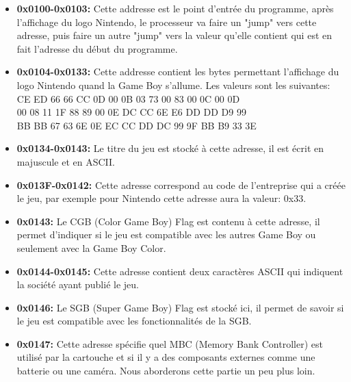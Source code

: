 \documentclass{report}
\begin{document}
\begin{itemize}

\item \textbf{0x0100-0x0103:} Cette addresse est le point d'entrée du programme, après l'affichage du logo Nintendo, le processeur va faire un "jump" vers cette adresse, puis faire un autre "jump" vers la valeur qu'elle contient qui est en fait l'adresse du début du programme.\\

\item \textbf{0x0104-0x0133:} Cette addresse contient les bytes permettant l'affichage du logo Nintendo quand la Game Boy s'allume. Les valeurs sont les suivantes:
\\CE ED 66 66 CC 0D 00 0B 03 73 00 83 00 0C 00 0D
\\00 08 11 1F 88 89 00 0E DC CC 6E E6 DD DD D9 99
\\BB BB 67 63 6E 0E EC CC DD DC 99 9F BB B9 33 3E\\

\item \textbf{0x0134-0x0143:} Le titre du jeu est stocké à cette adresse, il est écrit en majuscule et en ASCII.\\

\item \textbf{0x013F-0x0142:} Cette adresse correspond au code de l'entreprise qui a créée le jeu, par exemple pour Nintendo cette adresse aura la valeur: 0x33.\\

\item \textbf{0x0143:} Le CGB (Color Game Boy) Flag est contenu à cette adresse, il permet d'indiquer si le jeu est compatible avec les autres Game Boy ou seulement avec la Game Boy Color.\\

\item \textbf{0x0144-0x0145:} Cette adresse contient deux caractères ASCII qui indiquent la société ayant publié le jeu.\\

\item \textbf{0x0146:} Le SGB (Super Game Boy) Flag est stocké ici, il permet de savoir si le jeu est compatible avec les fonctionnalités de la SGB.\\

\item \textbf{0x0147:} Cette adresse spécifie quel MBC (Memory Bank Controller) est utilisé par la cartouche et si il y a des composants externes comme une batterie ou une caméra. Nous aborderons cette partie un peu plus loin.\\


\end{itemize}
\end{document}
